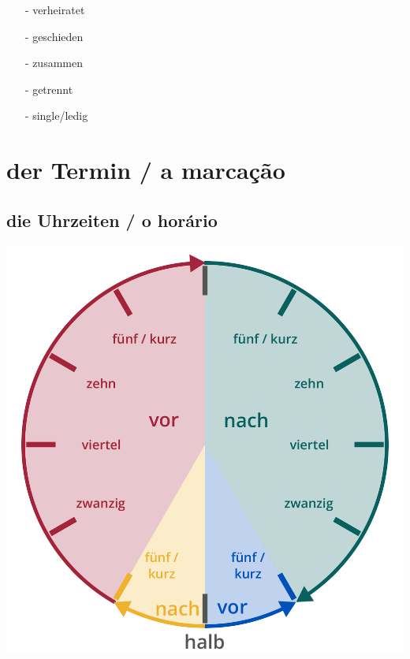             \begin{itemize}[topsep=0pt,itemsep=4pt,parsep=0pt]
                \item[-] verheiratet 
                \item[-] geschieden 
                \item[-] zusammen 
                \item[-] getrennt 
                \item[-] single/ledig 
            \end{itemize}

    \vfill\null\pagebreak\section{der Termin / a marcação}\label{section:deutsch:der_termin}
    
        \subsection{die Uhrzeiten / o horário}\label{subsection:deutsch:die_uhrzeiten}

            \centering\includegraphics[width=.5\linewidth]{figures/uhrzeiten.pdf}

